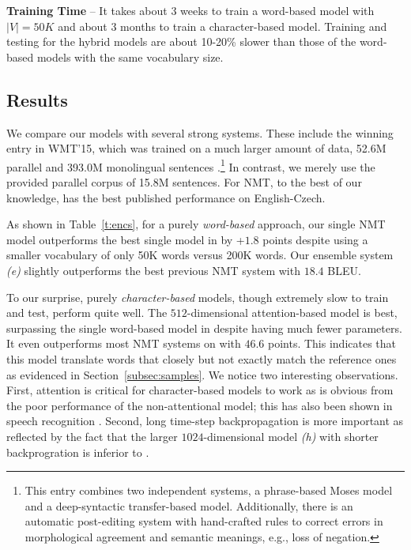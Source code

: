 {\bf Training Time} -- It takes about 3 weeks to train a word-based model with
$|V|=50K$ and about 3 months to train a character-based model. Training and
testing for the hybrid models are about 10-20\% slower than those of the word-based
models with the same vocabulary size.

\subsection{Results}

We compare our models with several strong systems. These include the
winning entry in WMT'15, which was
trained on a much larger amount of data, 52.6M parallel
 and 393.0M monolingual sentences \cite{bojar15wmt}.\footnote{This
entry combines two independent
systems, a phrase-based Moses model and a deep-syntactic transfer-based model.
Additionally, there is  an automatic
post-editing system with hand-crafted rules to correct errors
in morphological agreement and semantic meanings, e.g., loss of negation.}
In contrast, we merely use the
provided parallel corpus of 15.8M sentences. %
For NMT, to the best of our knowledge, \cite{jean15wmt} has
the best published performance on English-Czech.

As shown in Table~\ref{t:encs}, for a purely {\it word-based} approach, 
our single NMT model outperforms the best single model in \cite{jean15wmt} by
+$1.8$ points despite
using a smaller vocabulary of only 50K words versus 200K words. 
Our ensemble system {\it (e)} slightly outperforms the best previous NMT system with $18.4$ BLEU.

To our surprise, purely {\it character-based} models, though extremely slow to
train and test, perform quite well. The $512$-dimensional attention-based model \modelchar{} is
best, surpassing the single word-based model in
\cite{jean15wmt} despite having much fewer parameters. It even outperforms most NMT
systems  
on \chr{} with $46.6$ points. This indicates that this model translate words that closely but
not exactly match the reference ones as evidenced in
Section~\ref{subsec:samples}. 
We notice two interesting observations. First,
attention is critical for character-based models to work as is obvious from the
poor performance of the non-attentional model; this has also been shown in speech
recognition \cite{chan16}. Second, long time-step backpropagation is more important
as reflected by the fact that the larger $1024$-dimensional model {\it (h)} with shorter
backprogration is inferior to \modelchar{}. 

